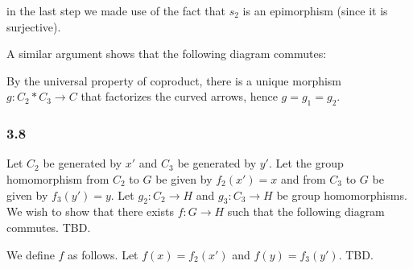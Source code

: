 \documentclass{article}
\def\Z{\mathbb{Z}}
\begin{document}



in the last step we made use of the fact that $s_2$ is an epimorphism (since it is surjective).

A similar argument shows that the following diagram commutes:


By the universal property of coproduct, there is a unique morphism $g: C_2 * C_3 \to C$ that factorizes the curved arrows, hence $g = g_1 = g_2$.

\subsubsection*{3.8}

Let $C_2$ be generated by $x'$ and $C_3$ be generated by $y'$. Let the group homomorphism from $C_2$ to $G$ be given by $f_2(x') = x$ and from $C_3$ to $G$ be given by $f_3(y') = y$. Let $g_2: C_2 \to H$ and $g_3: C_3 \to H$ be group homomorphisms. We wish to show that there exists $f: G \to H$ such that the following diagram commutes. TBD.

We define $f$ as follows. Let $f(x) = f_2(x')$ and $f(y) = f_3(y')$. TBD.
\end{document}
